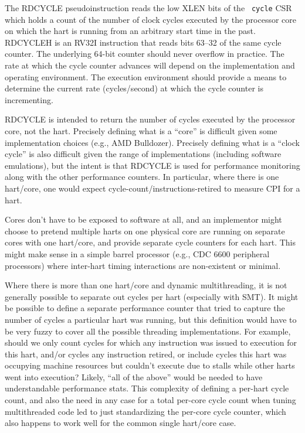 The RDCYCLE pseudoinstruction reads the low XLEN bits of the {\tt
  cycle} CSR which holds a count of the number of clock cycles
executed by the processor core on which the hart is running from an
arbitrary start time in the past.  RDCYCLEH is an RV32I
instruction that reads bits 63--32 of the same cycle counter.  The
underlying 64-bit counter should never overflow in practice.  The rate
at which the cycle counter advances will depend on the implementation
and operating environment.  The execution environment should provide a
means to determine the current rate (cycles/second) at which the cycle
counter is incrementing.

\begin{commentary}
RDCYCLE is intended to return the number of cycles executed by the
processor core, not the hart.  Precisely defining what is a ``core'' is
difficult given some implementation choices (e.g., AMD Bulldozer).
Precisely defining what is a ``clock cycle'' is also difficult given the
range of implementations (including software emulations), but the
intent is that RDCYCLE is used for performance monitoring along with the
other performance counters.  In particular, where there is one
hart/core, one would expect cycle-count/instructions-retired to
measure CPI for a hart.

Cores don't have to be exposed to software at all, and an implementor
might choose to pretend multiple harts on one physical core are
running on separate cores with one hart/core, and provide separate
cycle counters for each hart.  This might make sense in a simple
barrel processor (e.g., CDC 6600 peripheral processors) where
inter-hart timing interactions are non-existent or minimal.

Where there is more than one hart/core and dynamic multithreading, it
is not generally possible to separate out cycles per hart (especially
with SMT).  It might be possible to define a separate performance
counter that tried to capture the number of cycles a particular hart
was running, but this definition would have to be very fuzzy to cover
all the possible threading implementations.  For example, should we
only count cycles for which any instruction was issued to execution
for this hart, and/or cycles any instruction retired, or include
cycles this hart was occupying machine resources but couldn't execute
due to stalls while other harts went into execution? Likely, ``all of
the above'' would be needed to have understandable performance stats.
This complexity of defining a per-hart cycle count, and also the need
in any case for a total per-core cycle count when tuning multithreaded
code led to just standardizing the per-core cycle counter, which also
happens to work well for the common single hart/core case.


\end{commentary}
